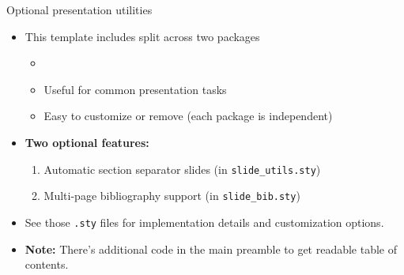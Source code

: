 \begin{frame}{Optional presentation utilities}

\begin{itemize}
\item This template includes  split across two packages
  \begin{itemize}
  \item {}
  \item Useful for common presentation tasks
  \item Easy to customize or remove (each package is independent)
  \end{itemize}

\bigskip

\item \textbf{Two optional features:}
  \begin{enumerate}
  \item Automatic section separator slides (in \texttt{slide\_utils.sty})
  \item Multi-page bibliography support (in \texttt{slide\_bib.sty})
  \end{enumerate}

\bigskip

\item See those \texttt{.sty} files for implementation details and customization options.
\item \textbf{Note:} There's additional code in the main preamble to get readable table of contents.
  \end{itemize}
\end{frame}

